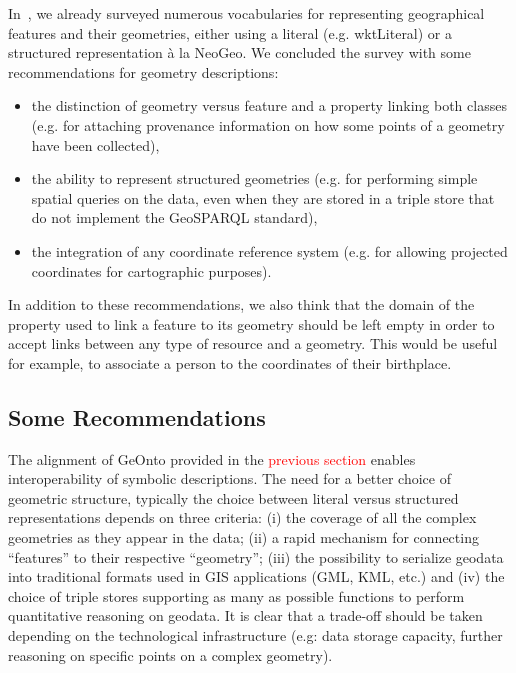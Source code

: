 In~\cite{Atemezing:TC12}, we already surveyed numerous vocabularies for representing geographical features and their geometries, either using a literal (e.g. wktLiteral) or a structured representation \`a la NeoGeo. We concluded the survey with some recommendations for geometry descriptions:
\begin{itemize}
 \item the distinction of geometry versus feature and a property linking both classes (e.g. for attaching provenance information on how some points of a geometry have been collected),
 \item the ability to represent structured geometries (e.g. for performing simple spatial queries on the data, even when they are stored in a triple store that do not implement the GeoSPARQL standard),
 \item the integration of any coordinate reference system  (e.g. for allowing projected coordinates for cartographic purposes).
\end{itemize}
In addition to these recommendations, we also think that the domain of the property used to link a feature to its geometry should be left empty in order to accept links between any type of resource and a geometry. This would be useful for example, to associate a person to the coordinates of their birthplace.

\subsection{Some Recommendations}
The alignment of GeOnto provided in the \textcolor{red}{previous section} enables interoperability of symbolic descriptions. The need for a better choice of geometric structure, typically the choice between literal versus structured representations depends on three criteria: (i) the coverage of all the complex geometries as they appear in the data; (ii) a rapid mechanism for connecting ``features'' to their respective ``geometry''; (iii) the possibility to serialize geodata into traditional formats used in GIS applications (GML, KML, etc.) and (iv) the choice of triple stores supporting as many as possible functions to perform quantitative reasoning on geodata. It is clear that a trade-off should be taken depending on the technological infrastructure (e.g: data storage capacity, further reasoning on specific points on a complex geometry).

